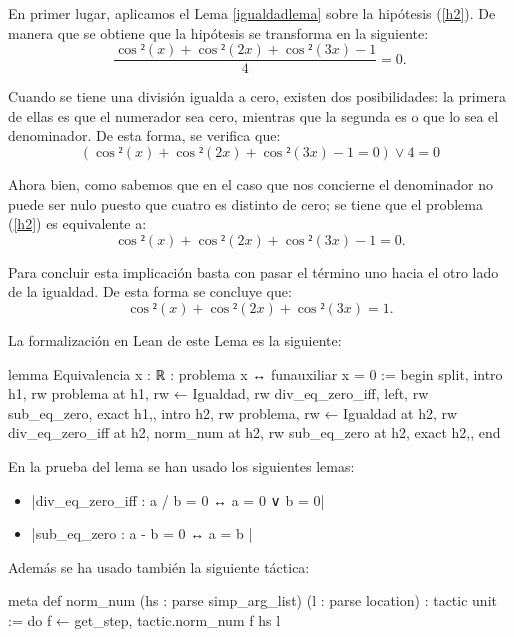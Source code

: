 \begin{demostracion}
  En primer lugar, aplicamos el Lema \ref{igualdadlema} sobre la
  hipótesis (\ref{h2}). De manera que se obtiene que la hipótesis
  se transforma en la siguiente:
  \begin{equation}
    \frac{\cos²(x)+\cos²(2x)+\cos²(3x)-1}{4}=0.
  \end{equation}
  
  Cuando se tiene una división igualda a cero, existen dos
  posibilidades: la primera de ellas es que el numerador sea
  cero, mientras que la segunda es o que lo sea el denominador.
  De esta forma, se verifica que:
  \begin{equation}
    (\cos²(x)+\cos²(2x)+\cos²(3x)-1=0) \lor 4=0
  \end{equation}

  Ahora bien, como sabemos que en el caso que nos concierne el
  denominador no puede ser nulo puesto que cuatro es distinto
  de cero; se tiene que el problema (\ref{h2}) es equivalente a:
  \begin{equation}
    \cos²(x)+\cos²(2x)+\cos²(3x)-1=0.
  \end{equation}

  Para concluir esta implicación basta con pasar el término uno
  hacia el otro lado de la igualdad. De esta forma se concluye que:
  \begin{equation}
    \cos²(x)+\cos²(2x)+\cos²(3x)=1.
  \end{equation}
\end{demostracion}

La formalización en Lean de este Lema es la siguiente:
\begin{leancode}
lemma Equivalencia {x : ℝ} : problema x ↔ funauxiliar x = 0 :=
begin
  split,
  {intro h1,
  rw problema at h1,
  rw ← Igualdad,
  rw div_eq_zero_iff,
  left,
  rw sub_eq_zero,
  exact h1,},
  {intro h2,
  rw problema,
  rw ← Igualdad at h2,
  rw div_eq_zero_iff at h2,
  norm_num at h2,
  rw sub_eq_zero at h2,
  exact h2,},
end
\end{leancode}

En la prueba del lema se han usado los siguientes lemas:
\begin{itemize}
\item {}|div_eq_zero_iff : a / b = 0 ↔ a = 0 ∨ b = 0|
\item {}|sub_eq_zero : a - b = 0 ↔ a = b |
\end{itemize}

Además se ha usado también la siguiente táctica:
\begin{leancode}
meta def norm_num (hs : parse simp_arg_list) (l : parse location) :
tactic unit :=
do f ← get_step, tactic.norm_num f hs l
\end{leancode}


